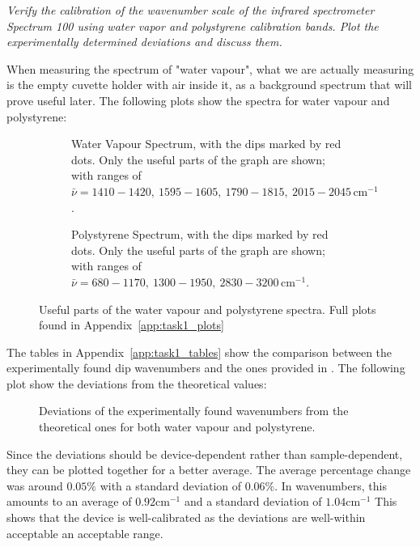 \documentclass{article}
\begin{document}
\textit{Verify the calibration of the wavenumber scale of the infrared spectrometer Spectrum 100 using
water vapor and polystyrene calibration bands. Plot the experimentally determined deviations and
discuss them.}

When measuring the spectrum of "water vapour", what we are actually measuring is the empty cuvette holder with air inside it, as a background spectrum that will prove useful later. The following plots show the spectra for water vapour and polystyrene:


\begin{figure}[h]
    \centering
    \begin{subfigure}[t]{0.48\textwidth}
        \centering
        \scalebox{0.5}{}
        \caption{Water Vapour Spectrum, with the dips marked by red dots. Only the useful parts of the graph are shown; with ranges of $\bar{\nu} = 1410-1420, \ 1595-1605, \ 1790-1815,\ 2015-2045 \, \text{cm}^{-1}$.}
        \label{fig:water_vapour}
    \end{subfigure} \hfill
    \begin{subfigure}[t]{0.48\textwidth}
        \centering
        \scalebox{0.5}{}
        \caption{Polystyrene Spectrum, with the dips marked by red dots. Only the useful parts of the graph are shown; with ranges of $\bar{\nu} = 680-1170, \ 1300-1950, \ 2830-3200 \, \text{cm}^{-1}$.}
        \label{fig:polystyrene}
    \end{subfigure}
	\caption{Useful parts of the water vapour and polystyrene spectra. Full plots found in Appendix~\ref{app:task1_plots}}
	\label{fig:water_polystyrene}
\end{figure}

The tables in Appendix~\ref{app:task1_tables} show the comparison between the experimentally found dip wavenumbers and the ones provided in \cite{riede_rotationvibration}. The following plot show the deviations from the theoretical values:

\begin{figure}[h]
	\centering
	
	\caption{Deviations of the experimentally found wavenumbers from the theoretical ones for both water vapour and polystyrene.}
	\label{fig:deviations}
\end{figure}

Since the deviations should be device-dependent rather than sample-dependent, they can be plotted together for a better average. The average percentage change was around $0.05\%$ with a standard deviation of $0.06\%$. In wavenumbers, this amounts to an average of $0.92 \text{cm}^{-1}$ and a standard deviation of $1.04 \text{cm}^{-1}$  This shows that the device is well-calibrated as the deviations are well-within acceptable an acceptable range.
\end{document}
